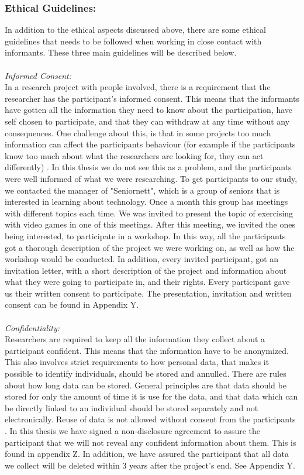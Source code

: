 \subsubsection{Ethical Guidelines:}
In addition to the ethical aspects discussed above, there are some ethical guidelines that needs to be followed when working in close contact with informants. These three main guidelines will be described below. \\ \\
\emph{Informed Consent:} \\
In a research project with people involved, there is a requirement that the researcher has the participant's informed consent. This means that the informants have gotten all the information they need to know about the participation, have self chosen to participate, and that they can withdraw at any time without any consequences. One challenge about this, is that in some projects too much information can affect the participants behaviour (for example if the participants know too much about what the researchers are looking for, they can act differently) \cite{qualitative}. In this thesis we do not see this as a problem, and the participants were well informed of what we were researching. To get participants to our study, we contacted the manager of "Seniornett", which is a group of seniors that is interested in learning about technology. Once a month this group has meetings with different topics each time. We was invited to present the topic of exercising with video games in one of this meetings. After this meeting, we invited the ones being interested, to participate in a workshop. In this way, all the participants got a thorough description of the project we were working on, as well as how the workshop would be conducted. In addition, every invited participant, got an invitation letter, with a short description of the project and information about what they were going to participate in, and their rights. Every participant gave us their written consent to participate. The presentation, invitation and written consent can be found in Appendix Y.   \\ \\
\emph{Confidentiality:}\\
Researchers are required to keep all the information they collect about a participant confident. This means that the information have to be anonymized. This also involves strict requirements to how personal data, that makes it possible to identify individuals, should be stored and annulled. There are rules about how long data can be stored. General principles are that data should be stored for only the amount of time it is use for the data, and that data which can be directly linked to an individual should be stored separately and not electronically.  Reuse of data is not allowed without consent from the participants \cite{qualitative}. In this thesis we have signed a non-disclosure agreement to assure the participant that we will not reveal any confident information about them. This is found in appendix Z. In addition, we have assured the participant that all data we collect will be deleted within 3 years after the project's end. See Appendix Y. \\ \\
